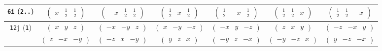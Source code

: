 \documentclass[fleqn,9pt,landscape]{jsarticle}
\begin{document}
\begin{center}
\begin{longtable}{ccccccc}
{\tt 6i} ({\tt 2..}) & $ \begin{pmatrix} x & \frac{1}{2} & \frac{1}{2} \end{pmatrix} $ & $ \begin{pmatrix} - x & \frac{1}{2} & \frac{1}{2} \end{pmatrix} $ & $ \begin{pmatrix} \frac{1}{2} & x & \frac{1}{2} \end{pmatrix} $ & $ \begin{pmatrix} \frac{1}{2} & - x & \frac{1}{2} \end{pmatrix} $ & $ \begin{pmatrix} \frac{1}{2} & \frac{1}{2} & x \end{pmatrix} $ & $ \begin{pmatrix} \frac{1}{2} & \frac{1}{2} & - x \end{pmatrix} $ \\ \hline
{\tt 12j} ({\tt 1}) & $ \begin{pmatrix} x & y & z \end{pmatrix} $ & $ \begin{pmatrix} - x & - y & z \end{pmatrix} $ & $ \begin{pmatrix} x & - y & - z \end{pmatrix} $ & $ \begin{pmatrix} - x & y & - z \end{pmatrix} $ & $ \begin{pmatrix} z & x & y \end{pmatrix} $ & $ \begin{pmatrix} - z & - x & y \end{pmatrix} $ \\
& $ \begin{pmatrix} z & - x & - y \end{pmatrix} $ & $ \begin{pmatrix} - z & x & - y \end{pmatrix} $ & $ \begin{pmatrix} y & z & x \end{pmatrix} $ & $ \begin{pmatrix} - y & z & - x \end{pmatrix} $ & $ \begin{pmatrix} - y & - z & x \end{pmatrix} $ & $ \begin{pmatrix} y & - z & - x \end{pmatrix} $ \\
\end{longtable}
\end{center}
\end{document}
